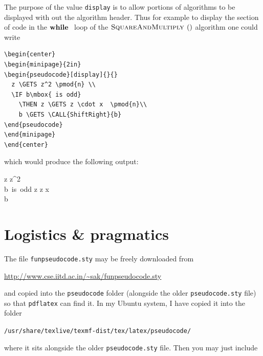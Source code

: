 \documentclass[a4]{article}
\newcommand{\keyword}[1]{\texttt{#1}}
\begin{document}
The purpose of the value \verb+display+ is to allow portions of
algorithms to be displayed with out the algorithm header. Thus
for example to display the section of code in the $\mbox{\bfseries while }$ loop
of the $\mbox{\textsc{SquareAndMultiply\ }}()$ algorithm one could write

\begin{verbatim}
\begin{center}
\begin{minipage}{2in}
\begin{pseudocode}[display]{}{}
  z \GETS z^2 \pmod{n} \\
  \IF b\mbox{ is odd}
    \THEN z \GETS z \cdot x  \pmod{n}\\
    b \GETS \CALL{ShiftRight}{b}
\end{pseudocode}
\end{minipage}
\end{center}
\end{verbatim}

\noindent which would produce the following output:

\begin{center}
\begin{minipage}{2in}
\begin{pseudocode}[display]{}{}
  z \GETS z^2  \\
  \IF b\mbox{ is odd}
    \THEN z \GETS z \cdot x  \\
     b \GETS {}
\end{pseudocode}
\end{minipage}
\end{center}

\section{Logistics \& pragmatics}

The file \keyword{funpseudocode.sty} may be freely downloaded from 

\centerline{\url{http://www.cse.iitd.ac.in/~sak/funpseudocode.sty}}

\noindent{}and copied into the \keyword{pseudocode} folder (alongside the older
\keyword{pseudocode.sty} file) so that \keyword{pdflatex} can find it. In my
Ubuntu system, I have copied it into the folder

\centerline{\keyword{/usr/share/texlive/texmf-dist/tex/latex/pseudocode/}}
\noindent{}where it sits alongside the older \keyword{pseudocode.sty} file.
Then  you may just include 
\end{document}
